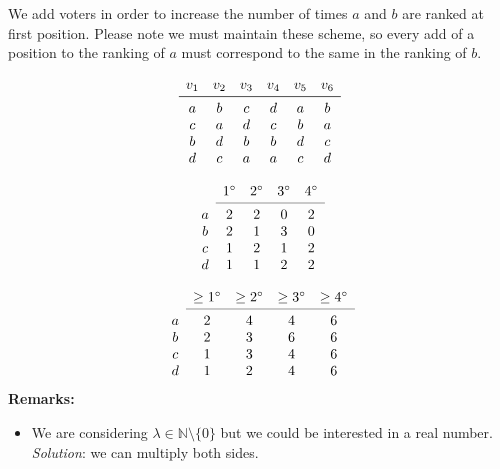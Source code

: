 We add voters in order to increase the number of times $a$ and $b$ are ranked at first position. Please note we must maintain these scheme, so every add of a position to the ranking of $a$ must correspond to the same in the ranking of $b$.

\[
\begin{array}{cccccc}
v_1
& v_2
& v_3 
& v_4
& v_5
& v_6 \\
\midrule 
a
& b
& c 
& d
& a
& b \\
c
& a
& d
& c
& b
& a \\
b
& d
& b
& b
& d
& c \\
d
& c
& a
& a
& c
& d \\
\end{array}
\]

\[
\begin{array}{ccccc}
& 1^\circ
& 2^\circ
& 3^\circ
& 4^\circ \\
\cmidrule{2-5}
a 
& 2
& 2
& 0
& 2 \\
b
& 2
& 1
& 3
& 0 \\
c
& 1
& 2
& 1
& 2 \\
d
& 1
& 1
& 2
& 2 \\
\end{array}
\]

\[
\begin{array}{ccccc}
& \geq 1^\circ
& \geq 2^\circ
& \geq 3^\circ
& \geq 4^\circ \\
\cmidrule{2-5}
a 
& 2
& 4
& 4
& 6 \\
b
& 2
& 3
& 6
& 6 \\
c
& 1
& 3
& 4
& 6 \\
d
& 1
& 2
& 4
& 6 \\
\end{array}
\]
\textbf{Remarks:}
\begin{itemize}
	\item We are considering $\lambda \in \mathbb{N} \setminus \{0\}$ but we could be interested in a real number. \textit{Solution}: we can multiply both sides.
\end{itemize}
\fi
  
